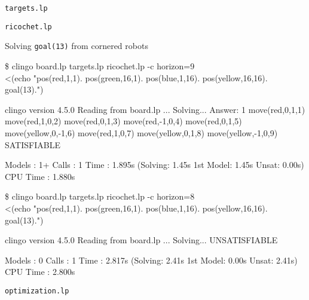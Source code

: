 \begin{frame}[fragile]{\texttt{targets.lp}}
\bigskip

\end{frame}
\begin{frame}[fragile]{\texttt{ricochet.lp}}
\bigskip

\end{frame}
\begin{frame}[fragile]{Solving \lstinline{goal(13)} from cornered robots}
\tiny
\begin{semiverbatim}
\$ clingo board.lp targets.lp ricochet.lp -c horizon=9 \\
        <(echo "pos(red,1,1). pos(green,16,1). pos(blue,1,16). pos(yellow,16,16).   goal(13).")\pause

clingo version 4.5.0
Reading from board.lp ...
Solving...
Answer: 1
move(red,0,1,1)     move(red,1,0,2) move(red,0,1,3)    move(red,-1,0,4) move(red,0,1,5) \\
move(yellow,0,-1,6) move(red,1,0,7) move(yellow,0,1,8) move(yellow,-1,0,9)
SATISFIABLE

Models       : 1+
Calls        : 1
Time         : 1.895s (Solving: 1.45s 1st Model: 1.45s Unsat: 0.00s)
CPU Time     : 1.880s\pause


\$ clingo board.lp targets.lp ricochet.lp -c horizon=8 \\
        <(echo "pos(red,1,1). pos(green,16,1). pos(blue,1,16). pos(yellow,16,16).   goal(13).")\pause

clingo version 4.5.0
Reading from board.lp ...
Solving...
UNSATISFIABLE

Models       : 0
Calls        : 1
Time         : 2.817s (Solving: 2.41s 1st Model: 0.00s Unsat: 2.41s)
CPU Time     : 2.800s
\end{semiverbatim}
\end{frame}
\begin{frame}[fragile]{\texttt{optimization.lp}}
\bigskip

\end{frame}
